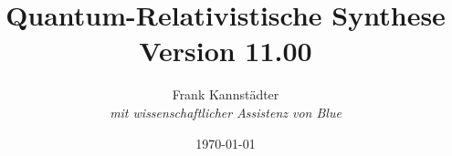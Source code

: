 \title{Quantum-Relativistische Synthese Version 11.00}
\author{Frank Kannst\"adter\\
  \textit{mit wissenschaftlicher Assistenz von Blue}}
\date{\today}
\maketitle
